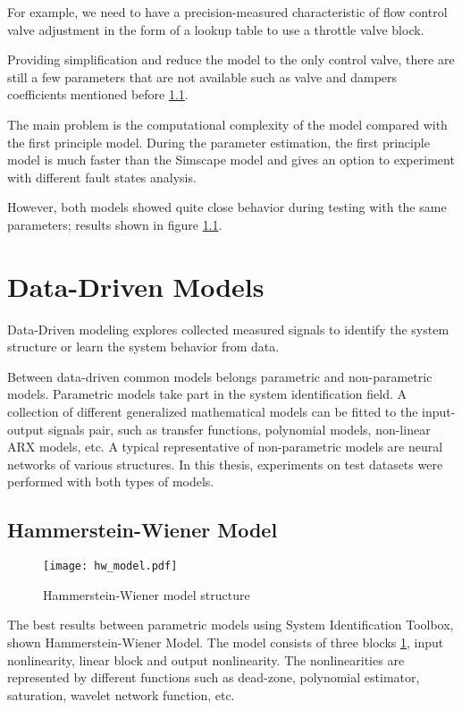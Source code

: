 For example, we need to have a precision-measured characteristic of flow
control valve adjustment in the form of a lookup table to use a throttle
valve block.

Providing simplification and reduce the model to the only control valve,
there are still a few parameters that are not available such as valve and
dampers coefficients mentioned before \ref{}.

The main problem is the computational complexity of the model compared with
the first principle model. During the parameter estimation, the first
principle model is much faster than the Simscape model and gives an option
to experiment with different fault states analysis. 

However, both models showed quite close behavior during testing with the
same parameters; results shown in figure \ref{}.


\section{Data-Driven Models}
Data-Driven modeling explores collected measured signals to identify the
system structure or learn the system behavior from data.

Between data-driven common models belongs parametric and non-parametric
models. Parametric models take part in the system identification field. A
collection of different generalized mathematical models can be fitted to
the input-output signals pair, such as transfer functions, polynomial
models, non-linear ARX models, etc.  A typical representative of
non-parametric models are neural networks of various structures.  In this
thesis, experiments on test datasets were performed with both types of
models. 
\subsection{Hammerstein-Wiener Model}

\begin{figure}[h!]
    \centering
    \texttt{[image: hw\_model.pdf]}
    \caption{Hammerstein-Wiener model structure}
    \label{fig:hw_model}
\end{figure}

The best results between parametric models using System Identification
Toolbox, shown Hammerstein-Wiener Model. The model consists of three blocks
\ref{fig:hw_model}, input nonlinearity, linear block and output
nonlinearity.  The nonlinearities are represented by different functions
such as dead-zone, polynomial estimator, saturation, wavelet network
function, etc. 


